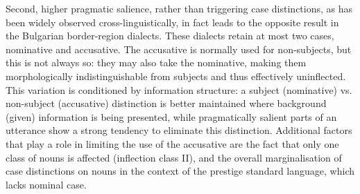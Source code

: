 \documentclass[output=paper]{langscibook}
\begin{document}
Second, higher pragmatic salience, rather than triggering case distinctions, as has been widely observed cross-linguistically, in fact leads to the opposite result in the Bulgarian border-region dialects. These dialects retain at most two cases, nominative and accusative. The accusative is normally used for non-subjects, but this is not always so: they may also take the nominative, making them morphologically indistinguishable from subjects and thus effectively uninflected. This variation is conditioned by information structure: a subject (nominative) vs. non-subject (accusative) distinction is better maintained where background (given) information is being presented, while pragmatically salient parts of an utterance show a strong tendency to eliminate this distinction. Additional factors that play a role in limiting the use of the accusative are the fact that only one class of nouns is affected (inflection class II), and the overall marginalisation of case distinctions on nouns in the context of the prestige standard language, which lacks nominal case.  
\end{document}

